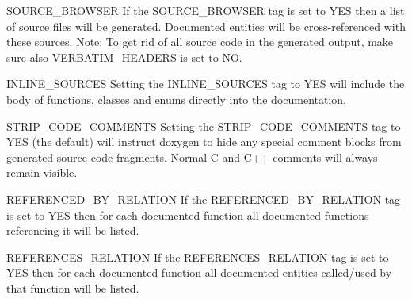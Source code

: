 \begin{DoxyDescription}
\item[{\ttfamily SOURCE\_\-BROWSER} ] If the {\ttfamily SOURCE\_\-BROWSER} tag is set to {\ttfamily YES} then a list of source files will be generated. Documented entities will be cross-\/referenced with these sources. Note: To get rid of all source code in the generated output, make sure also {\ttfamily VERBATIM\_\-HEADERS} is set to NO.

\label{config_cfg_inline_sources}
\hypertarget{config_cfg_inline_sources}{}
 
\item[{\ttfamily INLINE\_\-SOURCES} ] Setting the {\ttfamily INLINE\_\-SOURCES} tag to {\ttfamily YES} will include the body of functions, classes and enums directly into the documentation.

\label{config_cfg_strip_code_comments}
\hypertarget{config_cfg_strip_code_comments}{}
 
\item[{\ttfamily STRIP\_\-CODE\_\-COMMENTS} ] Setting the {\ttfamily STRIP\_\-CODE\_\-COMMENTS} tag to {\ttfamily YES} (the default) will instruct doxygen to hide any special comment blocks from generated source code fragments. Normal C and C++ comments will always remain visible.

\label{config_cfg_referenced_by_relation}
\hypertarget{config_cfg_referenced_by_relation}{}
 
\item[{\ttfamily REFERENCED\_\-BY\_\-RELATION} ] If the {\ttfamily REFERENCED\_\-BY\_\-RELATION} tag is set to {\ttfamily YES} then for each documented function all documented functions referencing it will be listed.

\label{config_cfg_references_relation}
\hypertarget{config_cfg_references_relation}{}
 
\item[{\ttfamily REFERENCES\_\-RELATION} ] If the {\ttfamily REFERENCES\_\-RELATION} tag is set to {\ttfamily YES} then for each documented function all documented entities called/used by that function will be listed.

\label{config_cfg_references_link_source}
\hypertarget{config_cfg_references_link_source}{}
 

\end{DoxyDescription}
